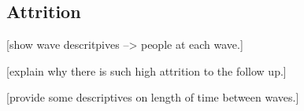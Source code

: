\documentclass{article}
\begin{document}




\subsection*{Attrition}

[show wave descritpives --> people at each wave.]

[explain why there is such high attrition to the follow up.]

[provide some descriptives on length of time between waves.]
\end{document}
